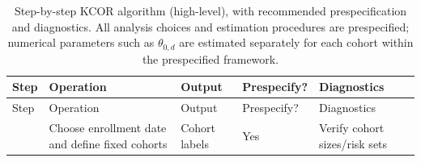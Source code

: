 \documentclass[
]{article}
\begin{document}
\begin{longtable}[]{@{}
  >{\raggedright\arraybackslash}p{}
  >{\raggedright\arraybackslash}p{}
  >{\raggedright\arraybackslash}p{}
  >{\raggedright\arraybackslash}p{}
  >{\raggedright\arraybackslash}p{}@{}}
\caption{Step-by-step KCOR algorithm (high-level), with recommended prespecification and diagnostics. All analysis choices and estimation procedures are prespecified; numerical parameters such as \(\theta_{0,d}\) are estimated separately for each cohort within the prespecified framework.}\label{tbl:KCOR_algorithm}\tabularnewline
\toprule\noalign{}
\begin{minipage}[b]{\linewidth}\raggedright
Step
\end{minipage} & \begin{minipage}[b]{\linewidth}\raggedright
Operation
\end{minipage} & \begin{minipage}[b]{\linewidth}\raggedright
Output
\end{minipage} & \begin{minipage}[b]{\linewidth}\raggedright
Prespecify?
\end{minipage} & \begin{minipage}[b]{\linewidth}\raggedright
Diagnostics
\end{minipage} \\
\midrule\noalign{}
\endfirsthead
\toprule\noalign{}
\begin{minipage}[b]{\linewidth}\raggedright
Step
\end{minipage} & \begin{minipage}[b]{\linewidth}\raggedright
Operation
\end{minipage} & \begin{minipage}[b]{\linewidth}\raggedright
Output
\end{minipage} & \begin{minipage}[b]{\linewidth}\raggedright
Prespecify?
\end{minipage} & \begin{minipage}[b]{\linewidth}\raggedright
Diagnostics
\end{minipage} \\
\midrule\noalign{}
\endhead
\bottomrule\noalign{}
\endlastfoot
1 & Choose enrollment date and define fixed cohorts & Cohort labels & Yes & Verify cohort sizes/risk sets \\

\end{longtable}
\end{document}
